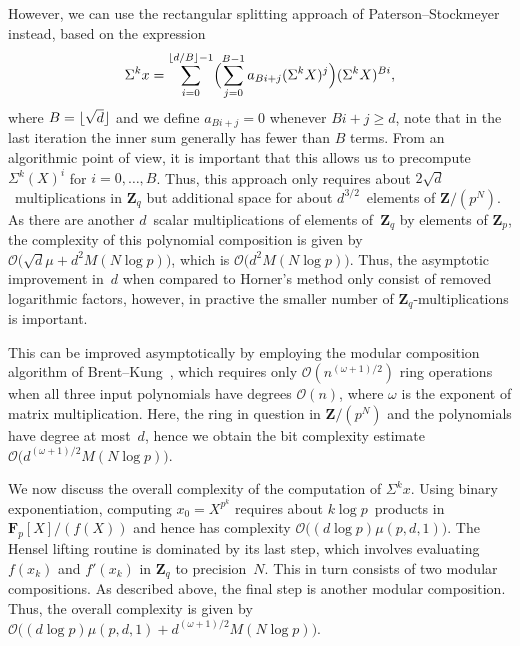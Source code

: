 However, we can use the rectangular splitting approach of 
Paterson--Stockmeyer~\citep{PatersonStockmeyer1973} instead, based 
on the expression 
\begin{equation}
\Sigma^k x = \sum_{i=0}^{\left\lfloor d/B\right\rfloor-1} \Bigl( \sum_{j=0}^{B-1} a_{Bi + j} (\Sigma^k X)^j  \Bigr) (\Sigma ^k X)^{Bi},
\end{equation}
where $B = \lfloor\sqrt{d}\rfloor$ and we define $a_{Bi + j} = 0$ whenever 
$Bi + j \geq d$, note that in the last iteration the inner sum generally 
has fewer than $B$ terms.  From an algorithmic point of view, it is 
important that this allows us to precompute $\Sigma^k(X)^i$ for 
$i = 0, \dotsc, B$.  Thus, this approach only requires about 
\mbox{$2 \sqrt{d}$}~multiplications in $\mathbf{Z}_q$ but additional space 
for about $d^{3/2}$~elements of $\mathbf{Z}/(p^N)$.  As there are another 
$d$~scalar multiplications of elements of~$\mathbf{Z}_q$ by elements of 
$\mathbf{Z}_p$, the complexity of this polynomial composition 
is given by $\mathcal{O}\bigl(\sqrt{d} \mu + d^2 M(N \log p)\bigr)$, which 
is $\mathcal{O}\bigl(d^2 M(N \log p)\bigr)$.  Thus, the asymptotic 
improvement in~$d$ when compared to Horner's method 
only consist of removed logarithmic factors, however, in practive the smaller 
number of $\mathbf{Z}_q$-multiplications is important.

This can be improved asymptotically by employing the modular composition 
algorithm of Brent--Kung~\citep{BrentKung1978}, which requires only 
$\mathcal{O}(n^{(\omega+1)/2})$ ring operations when all three input 
polynomials have degrees $\mathcal{O}(n)$, where $\omega$ is the exponent 
of matrix multiplication.  Here, the ring in question in $\mathbf{Z}/(p^N)$ 
and the polynomials have degree at most~$d$, hence we obtain the bit 
complexity estimate $\mathcal{O}(d^{(\omega + 1)/2} M(N \log p)\bigr)$.

We now discuss the overall complexity of the computation of $\Sigma^k x$.
Using binary exponentiation, computing \mbox{$x_0 = X^{p^k}$} 
requires about $k \log p$~products in~$\mathbf{F}_p[X] / (f(X))$ and hence 
has complexity $\mathcal{O}\bigl((d \log p) \mu(p,d,1)\bigr)$.  The Hensel 
lifting routine is dominated by its last step, which involves evaluating 
$f(x_k)$ and $f'(x_k)$ in $\mathbf{Z}_q$ to precision~$N$.  This in turn 
consists of two modular compositions.  As described above, the final step 
is another modular composition.  Thus, the overall complexity is given by 
$\mathcal{O}\bigl( (d \log p) \mu(p,d,1) 
+ d^{(\omega + 1)/2} M(N \log p) \bigr)$.

